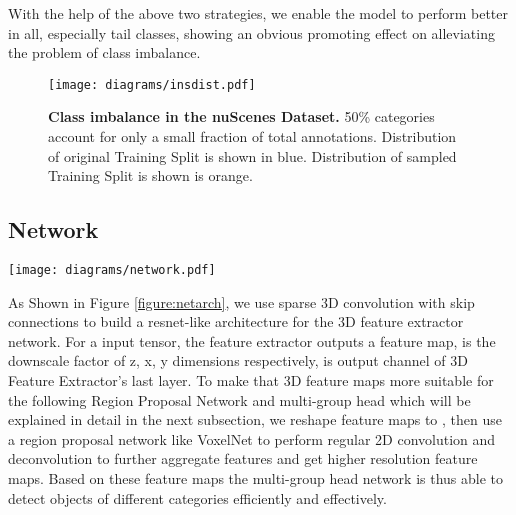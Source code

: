 \documentclass[10pt,twocolumn,letterpaper]{article}
\begin{document}
With the help of the above two strategies, we enable the model to perform better in all, especially tail classes, showing an obvious promoting effect on alleviating the problem of class imbalance.

\begin{figure}
\begin{center}
\texttt{[image: diagrams/insdist.pdf]}
\end{center}
\caption{\textbf{Class imbalance in the nuScenes Dataset.} 50\% categories account for only a small fraction of total annotations. Distribution of original Training Split is shown in blue. Distribution of sampled Training Split is shown is orange.}
\label{fig:insnumcls}
\end{figure}

\subsection{Network}

\begin{figure*}[t]
  \centering
  \texttt{[image: diagrams/network.pdf]} \\
  \caption{\textbf{Network Architecture.} 3D Feature Extractor is composed of submanifold and regular 3D sparse convolutions. Outputs of 3D Feature Extractor are of 16 downscale ratio, which are flatten along output axis and fed into following Region Proposal Network to generate 8 feature maps, followed by the multi-group head network to generate final predictions. Number of groups in head is set according to grouping specification.}
  \label{figure:netarch}
\end{figure*}

As Shown in Figure \ref{figure:netarch}, we use sparse 3D convolution with skip connections to build a resnet-like architecture for the 3D feature extractor network. For a  input tensor, the feature extractor outputs a  feature map,  is the downscale factor of z, x, y dimensions respectively,  is output channel of 3D Feature Extractor's last layer. To make that 3D feature maps more suitable for the following Region Proposal Network and multi-group head which will be explained in detail in the next subsection, we reshape feature maps to , then use a region proposal network like VoxelNet \cite{Zhou_2018_CVPR} to perform regular 2D convolution and deconvolution to further aggregate features and get higher resolution feature maps. Based on these feature maps the multi-group head network is thus able to detect objects of different categories efficiently and effectively. 
\end{document}
